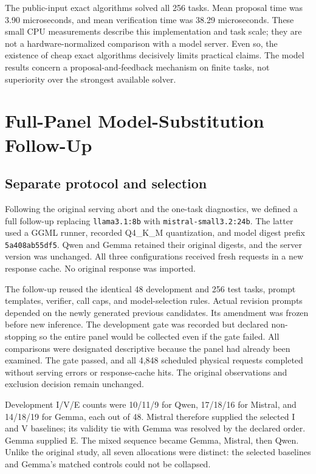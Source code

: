 The public-input exact algorithms solved all 256 tasks. Mean proposal time was 3.90 microseconds, and mean verification time was 38.29 microseconds. These small CPU measurements describe this implementation and task scale; they are not a hardware-normalized comparison with a model server. Even so, the existence of cheap exact algorithms decisively limits practical claims. The model results concern a proposal-and-feedback mechanism on finite tasks, not superiority over the strongest available solver.

\section{Full-Panel Model-Substitution Follow-Up}
\label{sec:replacement}

\subsection{Separate protocol and selection}

Following the original serving abort and the one-task diagnostics, we defined a full follow-up replacing \texttt{llama3.1:8b} with \texttt{mistral-small3.2:24b}. The latter used a GGML runner, recorded Q4\_K\_M quantization, and model digest prefix \texttt{5a408ab55df5}. Qwen and Gemma retained their original digests, and the server version was unchanged. All three configurations received fresh requests in a new response cache. No original response was imported.

The follow-up reused the identical 48 development and 256 test tasks, prompt templates, verifier, call caps, and model-selection rules. Actual revision prompts depended on the newly generated previous candidates. Its amendment was frozen before new inference. The development gate was recorded but declared non-stopping so the entire panel would be collected even if the gate failed. All comparisons were designated descriptive because the panel had already been examined. The gate passed, and all 4,848 scheduled physical requests completed without serving errors or response-cache hits. The original observations and exclusion decision remain unchanged.

Development I/V/E counts were 10/11/9 for Qwen, 17/18/16 for Mistral, and 14/18/19 for Gemma, each out of 48. Mistral therefore supplied the selected I and V baselines; its validity tie with Gemma was resolved by the declared order. Gemma supplied E. The mixed sequence became Gemma, Mistral, then Qwen. Unlike the original study, all seven allocations were distinct: the selected baselines and Gemma's matched controls could not be collapsed.

